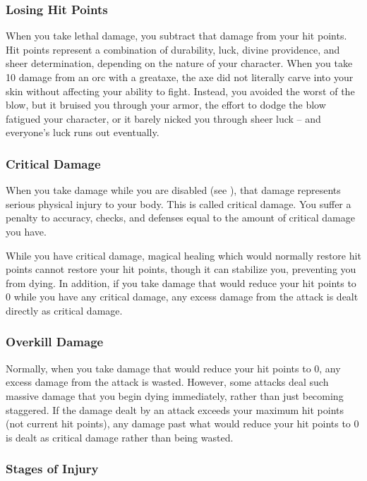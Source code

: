 \subsubsection{Losing Hit Points}
When you take lethal damage, you subtract that damage from your hit points.
 Hit points represent a combination of durability, luck, divine providence, and sheer determination, depending on the nature of your character.
When you take 10 damage from an orc with a greataxe, the axe did not literally carve into your skin without affecting your ability to fight.
Instead, you avoided the worst of the blow, but it bruised you through your armor, the effort to dodge the blow fatigued your character, or it barely nicked you through sheer luck -- and everyone's luck runs out eventually.

\subsubsection{Critical Damage}\label{Critical Damage}
When you take damage while you are disabled (see ), that damage represents serious physical injury to your body.
This is called critical damage.
You suffer a penalty to accuracy, checks, and defenses equal to the amount of critical damage you have.

While you have critical damage, magical healing which would normally restore hit points cannot restore your hit points, though it can stabilize you, preventing you from dying.
In addition, if you take damage that would reduce your hit points to 0 while you have any critical damage, any excess damage from the attack is dealt directly as critical damage.

\subsubsection{Overkill Damage}
Normally, when you take damage that would reduce your hit points to 0, any excess damage from the attack is wasted.
However, some attacks deal such massive damage that you begin dying immediately, rather than just becoming staggered.
If the damage dealt by an attack exceeds your maximum hit points (not current hit points), any damage past what would reduce your hit points to 0 is dealt as critical damage rather than being wasted.

\subsubsection{Stages of Injury}

